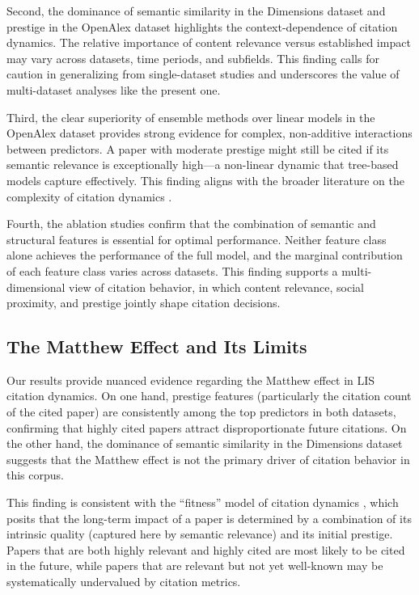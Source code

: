 \documentclass[12pt,a4paper]{article}
\begin{document}
Second, the dominance of semantic similarity in the Dimensions dataset and prestige in the OpenAlex dataset highlights the context-dependence of citation dynamics. The relative importance of content relevance versus established impact may vary across datasets, time periods, and subfields. This finding calls for caution in generalizing from single-dataset studies and underscores the value of multi-dataset analyses like the present one.

Third, the clear superiority of ensemble methods over linear models in the OpenAlex dataset provides strong evidence for complex, non-additive interactions between predictors. A paper with moderate prestige might still be cited if its semantic relevance is exceptionally high---a non-linear dynamic that tree-based models capture effectively. This finding aligns with the broader literature on the complexity of citation dynamics \citep{fortunato2018science, zeng2017science}.

Fourth, the ablation studies confirm that the combination of semantic and structural features is essential for optimal performance. Neither feature class alone achieves the performance of the full model, and the marginal contribution of each feature class varies across datasets. This finding supports a multi-dimensional view of citation behavior, in which content relevance, social proximity, and prestige jointly shape citation decisions.

\subsection{The Matthew Effect and Its Limits}

Our results provide nuanced evidence regarding the Matthew effect in LIS citation dynamics. On one hand, prestige features (particularly the citation count of the cited paper) are consistently among the top predictors in both datasets, confirming that highly cited papers attract disproportionate future citations. On the other hand, the dominance of semantic similarity in the Dimensions dataset suggests that the Matthew effect is not the primary driver of citation behavior in this corpus.

This finding is consistent with the ``fitness'' model of citation dynamics \citep{bianco2008fitness, wang2013quantifying}, which posits that the long-term impact of a paper is determined by a combination of its intrinsic quality (captured here by semantic relevance) and its initial prestige. Papers that are both highly relevant and highly cited are most likely to be cited in the future, while papers that are relevant but not yet well-known may be systematically undervalued by citation metrics.
\end{document}
